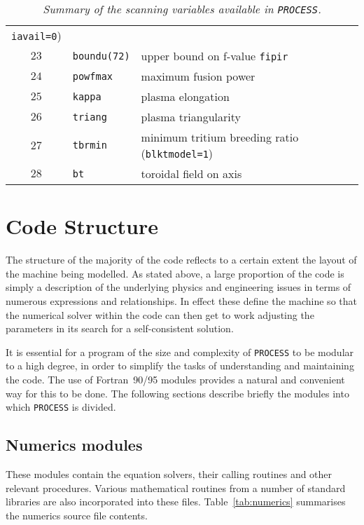 \documentclass[11pt,a4paper]{report}
\newcommand{\process}{\mbox{\texttt{PROCESS}}}
\begin{document}
\begin{table}[tbph]
\begin{center}
\begin{tabular}{||c|l|l||}
\texttt{iavail=0}) \\
$23$ & \texttt{boundu(72)} & upper bound on f-value \texttt{fipir} \\
$24$ & \texttt{powfmax}    & maximum fusion power \\
$25$ & \texttt{kappa}      & plasma elongation \\
$26$ & \texttt{triang}     & plasma triangularity \\
$27$ & \texttt{tbrmin}     & minimum tritium breeding ratio (\texttt{blktmodel=1}) \\
$28$ & \texttt{bt}         & toroidal field on axis \\
\hline
\end{tabular}
\end{center}
\caption[List of scanning variables]
{\label{tab:scans}
  \textit{Summary of the scanning variables available in \process.}
}
\end{table}

\section{Code Structure}

The structure of the majority of the code reflects to a certain extent the
layout of the machine being modelled. As stated above, a large proportion of
the code is simply a description of the underlying physics and engineering
issues in terms of numerous expressions and relationships. In effect these
define the machine so that the numerical solver within the code can then get
to work adjusting the parameters in its search for a self-consistent solution.

It is essential for a program of the size and complexity of \process\/ to be
modular to a high degree, in order to simplify the tasks of understanding and
maintaining the code. The use of Fortran~90/95 modules provides a natural and
convenient way for this to be done. The following sections describe briefly
the modules into which \process\/ is divided.

\subsection{Numerics modules}
\label{sec:numerics_modules}

These modules contain the equation solvers, their calling routines and other
relevant procedures. Various mathematical routines from a number of standard
libraries are also incorporated into these files. Table~\ref{tab:numerics}
summarises the numerics source file contents.
\end{document}
